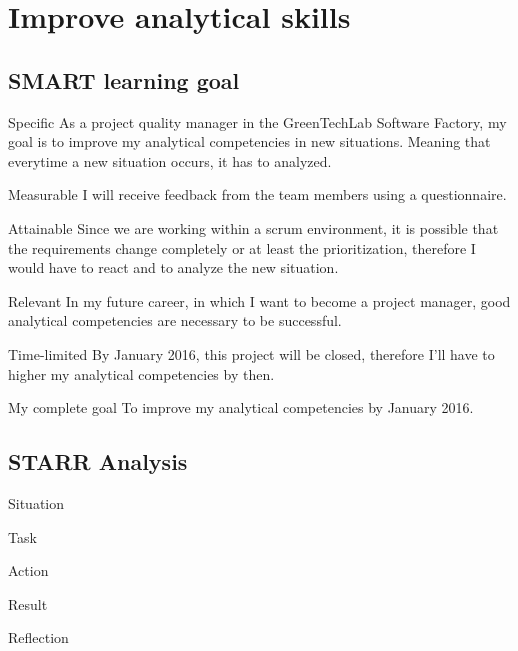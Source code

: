\documentclass[12pt]{article}
\begin{document}
	\section{Improve analytical skills}
	
	\subsection{SMART learning goal}
	\begin{SMART}
	    \item[Specific] As a project quality manager in the GreenTechLab Software Factory, my goal is to improve my analytical competencies in new situations. Meaning that everytime a new situation occurs, it has to analyzed.
	    \item[Measurable] I will receive feedback from the team members using a questionnaire.
	    \item[Attainable] Since we are working within a scrum environment, it is possible that the requirements change completely or at least the prioritization, therefore I would have to react and to analyze the new situation.
	    \item[Relevant] In my future career, in which I want to become a project manager, good analytical competencies are necessary to be successful.
	    \item[Time-limited] By January 2016, this project will be closed, therefore I’ll have to higher my analytical competencies by then.
	    \item[My complete goal] To improve my analytical competencies by January 2016.
	\end{SMART}
	
	\subsection{STARR Analysis}
	\begin{STARR}
	    \item[Situation]
	    \item[Task]
	    \item[Action]
	    \item[Result]
	    \item[Reflection]
	\end{STARR}
	
	
	
	
	
\end{document}
